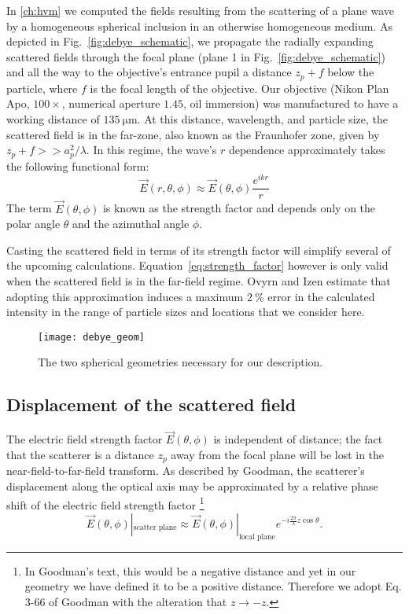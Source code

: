 In \autoref{ch:hvm} we computed the fields resulting from the scattering of
a plane wave by a homogeneous spherical inclusion in an otherwise
homogeneous medium. As depicted in Fig.~\ref{fig:debye_schematic}, we
propagate the radially expanding scattered fields through the focal plane (plane \num{1} in
Fig.~\ref{fig:debye_schematic}) and all the way to the objective's entrance pupil a distance
$z_p + f$ below the particle, where $f$ is the focal length of the objective.
Our objective  (Nikon Plan Apo, $\num{100}\times$, numerical aperture $\num{1.45}$,
oil immersion) was manufactured to have a working distance of $\SI{135}{\um}$.
At this distance, wavelength, and particle size, the scattered field is in the far-zone,
also known as the Fraunhofer zone, given by $z_p + f >> a_p^2/\lambda$. In this
regime, the wave's $r$ dependence approximately takes the following functional form:
\begin{equation}
  \label{eq:strength_factor}
  \vec{E}(r, \theta, \phi) \approx  \vec{E}(\theta, \phi) \frac{e^{ikr}}{r}
\end{equation}
The term $\vec{E}(\theta, \phi)$ is known as the strength factor and
depends only on the polar angle $\theta$ and the azimuthal angle $\phi$. 

Casting the scattered field in terms of its strength factor will simplify
several of the upcoming calculations. Equation~\eqref{eq:strength_factor} however
is only valid when the scattered field is in the far-field regime.
Ovyrn and Izen\cite{izen00} estimate that adopting this approximation induces a maximum
$\SI{2}{\percent}$ error in the calculated intensity in the range of particle
sizes and locations that we consider here. %

\begin{figure}
  \centering
  \texttt{[image: debye\_geom]}
  \caption{The two spherical geometries necessary for our description.}
  \label{fig:debye_geom}
\end{figure}

\subsection{ Displacement of the scattered field}

The electric field strength factor $\vec{E}(\theta, \phi)$ is independent
of distance; the fact that the scatterer is a distance $z_p$ away
from the focal plane will be lost in the near-field-to-far-field transform.
As described by Goodman\cite{goodman05},
the scatterer's displacement along the optical axis may be approximated by
a relative phase shift of the electric field strength factor
\footnote{In Goodman's text\cite{goodman05}, this would be a negative
  distance and yet in our geometry we have defined it to be a positive distance.
  Therefore we adopt Eq. 3-66 of Goodman with the alteration that  $z \rightarrow -z$.}
\begin{equation}
  \label{eq:entrance_pupil}
    \vec{E}(\theta, \phi)|_{\text{scatter plane}} \approx \vec{E}(\theta, \phi)|_{\text{focal plane}} e^{-i\frac{2\pi}{\lambda}z\cos{\theta} }.
  \end{equation}

